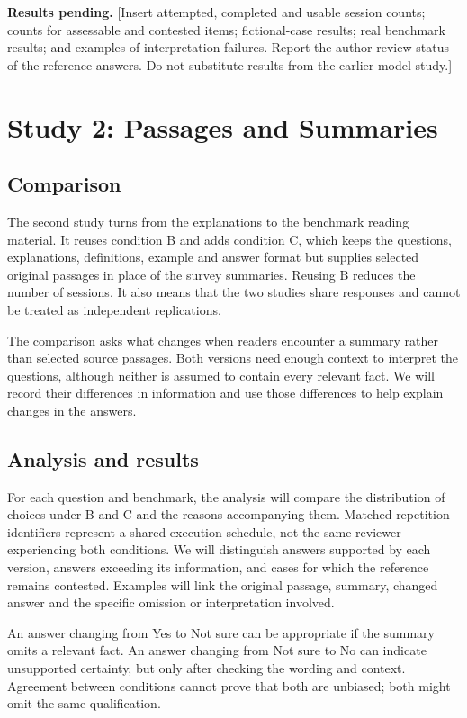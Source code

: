 \documentclass[10pt,conference]{IEEEtran}
\begin{document}
\textbf{Results pending.} [Insert attempted, completed and usable session counts; counts for assessable and contested items; fictional-case results; real benchmark results; and examples of interpretation failures. Report the author review status of the reference answers. Do not substitute results from the earlier model study.]

\section{Study 2: Passages and Summaries}
\subsection{Comparison}
The second study turns from the explanations to the benchmark reading material. It reuses condition B and adds condition C, which keeps the questions, explanations, definitions, example and answer format but supplies selected original passages in place of the survey summaries. Reusing B reduces the number of sessions. It also means that the two studies share responses and cannot be treated as independent replications.

The comparison asks what changes when readers encounter a summary rather than selected source passages. Both versions need enough context to interpret the questions, although neither is assumed to contain every relevant fact. We will record their differences in information and use those differences to help explain changes in the answers.

\subsection{Analysis and results}
For each question and benchmark, the analysis will compare the distribution of choices under B and C and the reasons accompanying them. Matched repetition identifiers represent a shared execution schedule, not the same reviewer experiencing both conditions. We will distinguish answers supported by each version, answers exceeding its information, and cases for which the reference remains contested. Examples will link the original passage, summary, changed answer and the specific omission or interpretation involved.

An answer changing from Yes to Not sure can be appropriate if the summary omits a relevant fact. An answer changing from Not sure to No can indicate unsupported certainty, but only after checking the wording and context. Agreement between conditions cannot prove that both are unbiased; both might omit the same qualification.
\end{document}
